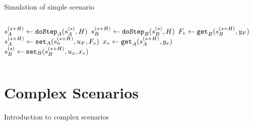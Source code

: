 \documentclass{beamer}
\begin{document}
\begin{frame}{Simulation of simple scenario}
\begin{columns}[T]
    \hfill%
    \begin{column}{.48\textwidth}
        \begin{algorithm}[H]
            \caption{Step function of scenario}
            \begin{algorithmic}[1]
              \scriptsize
              \State $s_{A}^{(s+H)} \gets \mathtt{doStep}_{A}(s_{A}^{(s)}, H)$
              \State $s_{B}^{(s+H)} \gets \mathtt{doStep}_{B}(s_{B}^{(s)}, H)$
              \State $F_v \gets \mathtt{get}_{B}(s_{B}^{(s+H)}, y_{F})$
              \State $s_{A}^{(s+H)} \gets \mathtt{set}_{A}(s_{a}^{(s+H)}, u_{F}, F_v)$
              \State $x_v \gets \mathtt{get}_{A}(s_{A}^{(s+H)}, y_{x})$
              \State $s_{B}^{(s)} \gets \mathtt{set}_{B}(s_{B}^{(s+H)}, u_{x}, x_v)$
            \end{algorithmic}
          \end{algorithm}
    \end{column}%
    \end{columns}
\end{frame}


\section{Complex Scenarios}

\begin{frame}{Introduction to complex scenarios}
    
\end{frame}
\end{document}
